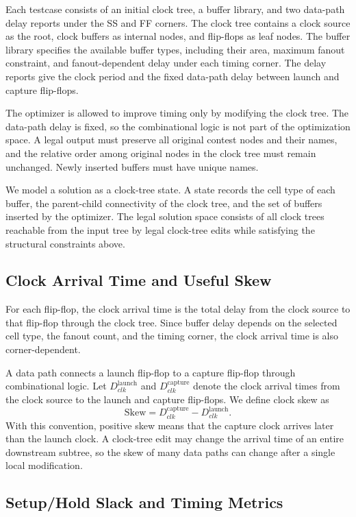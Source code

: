 \documentclass{article}
\begin{document}
Each testcase consists of an initial clock tree, a buffer library, and two data-path delay reports under the SS and FF corners. The clock tree contains a clock source as the root, clock buffers as internal nodes, and flip-flops as leaf nodes. The buffer library specifies the available buffer types, including their area, maximum fanout constraint, and fanout-dependent delay under each timing corner. The delay reports give the clock period and the fixed data-path delay between launch and capture flip-flops.

The optimizer is allowed to improve timing only by modifying the clock tree. The data-path delay is fixed, so the combinational logic is not part of the optimization space. A legal output must preserve all original contest nodes and their names, and the relative order among original nodes in the clock tree must remain unchanged. Newly inserted buffers must have unique names.

We model a solution as a clock-tree state. A state records the cell type of each buffer, the parent-child connectivity of the clock tree, and the set of buffers inserted by the optimizer. The legal solution space consists of all clock trees reachable from the input tree by legal clock-tree edits while satisfying the structural constraints above.

\subsection{Clock Arrival Time and Useful Skew}
For each flip-flop, the clock arrival time is the total delay from the clock source to that flip-flop through the clock tree. Since buffer delay depends on the selected cell type, the fanout count, and the timing corner, the clock arrival time is also corner-dependent.

A data path connects a launch flip-flop to a capture flip-flop through combinational logic. Let $D_{clk}^{\mathrm{launch}}$ and $D_{clk}^{\mathrm{capture}}$ denote the clock arrival times from the clock source to the launch and capture flip-flops. We define clock skew as
\begin{equation}
\mathrm{Skew} = D_{clk}^{\mathrm{capture}} - D_{clk}^{\mathrm{launch}}.
\end{equation}
With this convention, positive skew means that the capture clock arrives later than the launch clock. A clock-tree edit may change the arrival time of an entire downstream subtree, so the skew of many data paths can change after a single local modification.
\subsection{Setup/Hold Slack and Timing Metrics}
\end{document}
